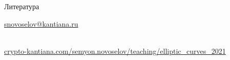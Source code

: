 \documentclass{beamer}
\begin{document}
\begin{frame}{Литература}
\nocite{Menezes1993}\nocite{Blake1999}\nocite{Washington2008}
\printbibliography

\begin{center}
    \begin{tcolorbox}[enhanced,hbox,colback=block-green-color-bg,colframe=subsection-color!120,title=Контакты,center title]
        \begin{varwidth}{\textwidth}
            \begin{center}
                \href{mailto:snovoselov@kantiana.ru}{snovoselov@kantiana.ru}
            \end{center}
        \end{varwidth}
    \end{tcolorbox}	
\end{center}

\\
{\footnotesize
    \href{https://crypto-kantiana.com/semyon.novoselov/teaching/elliptic_curves_2021}{crypto-kantiana.com/semyon.novoselov/teaching/elliptic\_curves\_2021}
}

\end{frame}
\end{document}
